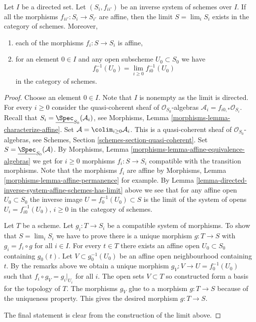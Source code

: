\begin{lemma}
\label{lemma-directed-inverse-system-has-limit}
Let $I$ be a directed set. Let $(S_i, f_{ii'})$ be an
inverse system of schemes over $I$. If all the morphisms
$f_{ii'} : S_i \to S_{i'}$ are affine, then the limit $S = \lim_i S_i$ exists
in the category of schemes. Moreover,
\begin{enumerate}
\item each of the morphisms $f_i : S \to S_i$ is affine,
\item for an element $0 \in I$ and any open subscheme $U_0 \subset S_0$
we have
$$
f_0^{-1}(U_0) = \lim_{i \geq 0} f_{i0}^{-1}(U_0)
$$
in the category of schemes.
\end{enumerate}
\end{lemma}

\begin{proof}
Choose an element $0 \in I$. Note that $I$ is nonempty as the limit is
directed. For every $i \geq 0$ consider the quasi-coherent sheaf of
$\mathcal{O}_{S_0}$-algebras $\mathcal{A}_i = f_{i0, *}\mathcal{O}_{S_i}$.
Recall that $S_i = \underline{\Spec}_{S_0}(\mathcal{A}_i)$,
see Morphisms, Lemma \ref{morphisms-lemma-characterize-affine}.
Set $\mathcal{A} = \colim_{i \geq 0} \mathcal{A}_i$.
This is a quasi-coherent sheaf of $\mathcal{O}_{S_0}$-algebras,
see Schemes, Section \ref{schemes-section-quasi-coherent}.
Set $S = \underline{\Spec}_{S_0}(\mathcal{A})$.
By Morphisms, Lemma \ref{morphisms-lemma-affine-equivalence-algebras}
we get for $i \geq 0$ morphisms $f_i : S \to S_i$ compatible with
the transition morphisms. Note that the morphisms $f_i$ are
affine by Morphisms, Lemma \ref{morphisms-lemma-affine-permanence} for example.
By Lemma \ref{lemma-directed-inverse-system-affine-schemes-has-limit} above
we see that for any affine open $U_0 \subset S_0$ the
inverse image $U = f_0^{-1}(U_0) \subset S$ is the limit of the
system of opens $U_i = f_{i0}^{-1}(U_0)$, $i \geq 0$ in the
category of schemes.

\medskip\noindent
Let $T$ be a scheme. Let $g_i : T \to S_i$ be a compatible system
of morphisms. To show that $S = \lim_i S_i$ we have
to prove there is a unique morphism $g : T \to S$ with
$g_i = f_i \circ g$ for all $i \in I$.
For every $t \in T$ there exists an affine open
$U_0 \subset S_0$ containing $g_0(t)$. Let $V \subset g_0^{-1}(U_0)$
be an affine open neighbourhood containing $t$.
By the remarks above we obtain a unique morphism
$g_V : V \to U = f_0^{-1}(U_0)$ such that $f_i \circ g_V = g_i|_{U_i}$
for all $i$. The open sets $V \subset T$ so constructed form
a basis for the topology of $T$. The morphisms $g_V$ glue to a morphism
$g : T \to S$ because of the uniqueness property. This gives the
desired morphism $g : T \to S$.

\medskip\noindent
The final statement is clear from the construction of the limit above.
\end{proof}

